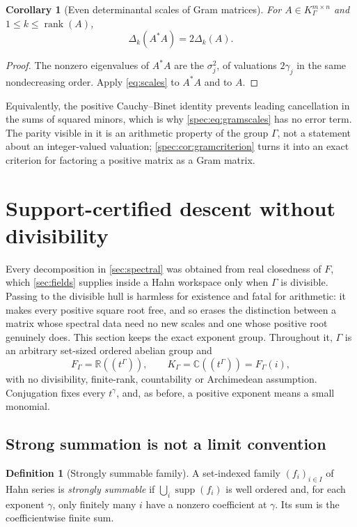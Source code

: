 \documentclass[11pt,a4paper]{article}
\numberwithin{equation}{section}
\newtheorem{corollary}[corollary]{Corollary}
\theoremstyle{definition}
\newtheorem{definition}[definition]{Definition}
\theoremstyle{remark}
\newcommand{\R}{\mathbb R}
\newcommand{\C}{\mathbb C}
\newcommand{\supp}{\operatorname{supp}}
\newcommand{\rank}{\operatorname{rank}}
\begin{document}
\begin{corollary}[Even determinantal scales of Gram matrices]\label{spec:cor:gramscales}
For $A\in K_\Gamma^{m\times n}$ and $1\le k\le\rank(A)$,
\begin{equation}\label{spec:eq:gramscales}
 \Delta_k(A^*A)=2\Delta_k(A).
\end{equation}
\end{corollary}
\begin{proof}
The nonzero eigenvalues of $A^*A$ are the $\sigma_j^2$, of valuations
$2\gamma_j$ in the same nondecreasing order. Apply \eqref{eq:scales} to
$A^*A$ and to $A$.
\end{proof}

Equivalently, the positive Cauchy--Binet identity prevents leading
cancellation in the sums of squared minors, which is why
\eqref{spec:eq:gramscales} has no error term. The parity visible in it is an
arithmetic property of the group $\Gamma$, not a statement about an
integer-valued valuation; \cref{spec:cor:gramcriterion} turns it into an
exact criterion for factoring a positive matrix as a Gram matrix.

\section{Support-certified descent without divisibility}
\label{spec:sec:descent}

Every decomposition in \cref{sec:spectral} was obtained from real closedness
of $F$, which \cref{sec:fields} supplies inside a Hahn workspace only when
$\Gamma$ is divisible. Passing to the divisible hull is harmless for
existence and fatal for arithmetic: it makes every positive square root free,
and so erases the distinction between a matrix whose spectral data need no
new scales and one whose positive root genuinely does. This section keeps the
exact exponent group. Throughout it, $\Gamma$ is an arbitrary set-sized
ordered abelian group and
\[
 F_\Gamma=\R((t^\Gamma)),\qquad K_\Gamma=\C((t^\Gamma))=F_\Gamma(i),
\]
with no divisibility, finite-rank, countability or Archimedean assumption.
Conjugation fixes every $t^\gamma$, and, as before, a positive exponent means
a small monomial.

\subsection{Strong summation is not a limit convention}

\begin{definition}[Strongly summable family]\label{spec:def:summable}
A set-indexed family $(f_i)_{i\in I}$ of Hahn series is \emph{strongly
summable} if $\bigcup_i\supp(f_i)$ is well ordered and, for each exponent
$\gamma$, only finitely many $i$ have a nonzero coefficient at $\gamma$. Its
sum is the coefficientwise finite sum.
\end{definition}
\end{document}
